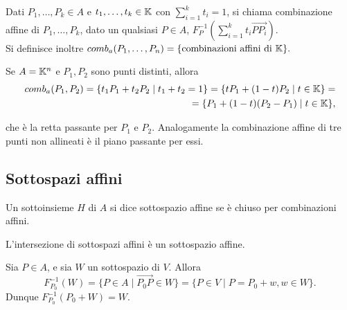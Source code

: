 \documentclass[a4paper,12pt]{article}
\newcommand{\Got}[1]{#1}
\newcommand{\got}[1]{{#1}}
\newcommand{\vet}[1]{\overrightarrow{#1}}
\begin{document}
 \begin{definition}
 \Got{Dati} $\got{P_1,\ldots,P_k\in A}$ \Got{e} $\got{t_1,\ldots,t_k\in \K}$ \Got{con} $\got{\sum_{i=1}^kt_i=1}$,
 \Got{si chiama combinazione affine di} $\got{P_1,\ldots,P_k}$, \Got{dato un qualsiasi} $\got{P\in A}$, 
 $\got{F_P^{-1}(\sum_{i=1}^kt_i\vet{PP_i})}$.\\
 \Got{Si definisce inoltre} $\got{comb_a(P_1,\ldots,P_n)=\{\text{combinazioni affini di }\K\}}.$
 \end{definition}
 
 \begin{esempio}
 \Got{Se} $\got{A=\K^n}$ \Got{e} $\got{P_1,P_2}$ \Got{sono punti distinti, allora}
 \begin{eqnarray*}
	\got{comb_a(P_1,P_2)=\{t_1P_1+t_2P_2\;|\;t_1+t_2=1\}=\{tP_1+(1-t)P_2\;|\; t\in \K\}=}\\
	\got{=\{P_1+(1-t)(P_2-P_1)\;|\; t\in \K\},}
 \end{eqnarray*}
 \end{esempio}

 \Got{che è la retta passante per} $\got{P_1}$ \Got{e} $\got{P_2.}$ \Got{Analogamente la combinazione affine di tre punti non allineati
 è il piano passante per essi.}
 
	\subsection{Sottospazi affini}
 
 \Got{Un sottoinsieme} $\got{H}$ \Got{di} $\got{A}$ \Got{si dice sottospazio affine se è chiuso per combinazioni affini.}
 
 \vspace{0.5cm}
 
 \begin{remark}
 \Got{L'intersezione di sottospazi affini è un sottospazio affine.}
 \end{remark}
 
 \vspace{0.5cm}
 
 \begin{esempio}
 \Got{Sia} $\got{P\in A}$, \Got{e sia} $\got{W}$ \Got{un sottospazio di} $\got{V.}$ \Got{Allora}
 $$\got{F^{-1}_{P_0}(W)=\{P\in A\;|\;}\vet{P_0P}\got{\in W\}=\{P\in V\;|\;P=P_0+w, w\in W\}}.$$
 \Got{Dunque} $\got{F^{-1}_{P_0}(P_0+W)=W}$.
 \end{esempio}
 
 \vspace{0.5cm}
 
\end{document}
